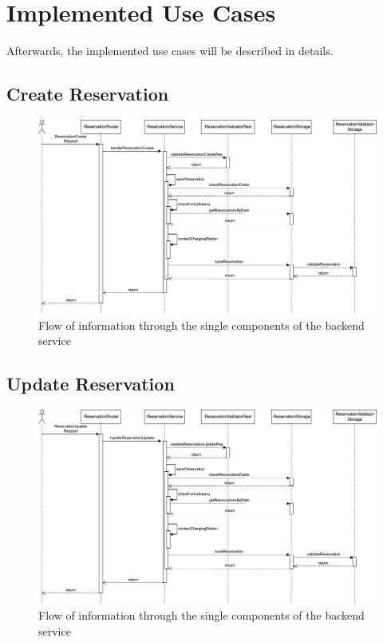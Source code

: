\section{Implemented Use Cases}
\label{ch:Implementation:sec:Implemented Use Cases}

Afterwards, the implemented use cases will be described in details.

\subsection{Create Reservation}
\label{ch:Implementation:sec:Implemented Use Cases:ssec:Create Reservation}

\begin{figure}[!ht]
    \centering
    \includegraphics[scale=0.4]{resources/images/main/6_implementation/processes/ReservationCreate.png}
    \caption{Flow of information through the single components of the backend service}
    \label{fig:create-reservation-seq-flow}
\end{figure}

\subsection{Update Reservation}
\label{ch:Implementation:sec:Implemented Use Cases:ssec:Update Reservation}


\begin{figure}[!ht]
    \centering
    \includegraphics[scale=0.4]{resources/images/main/6_implementation/processes/ReservationUpdate.png}
    \caption{Flow of information through the single components of the backend service}
    \label{fig:update-reservation-seq-flow}
\end{figure}


